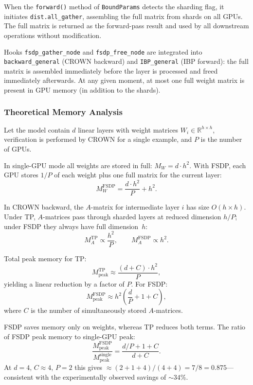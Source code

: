 When the \texttt{forward()} method of \texttt{BoundParams} detects the sharding
flag, it initiates \texttt{dist.all\_gather}, assembling the full matrix from
shards on all GPUs. The full matrix is returned as the forward-pass result and
used by all downstream operations without modification.

Hooks \texttt{fsdp\_gather\_node} and \texttt{fsdp\_free\_node} are integrated
into \texttt{backward\_general} (CROWN backward) and \texttt{IBP\_general}
(IBP forward): the full matrix is assembled immediately before the layer is
processed and freed immediately afterwards. At any given moment, at most one
full weight matrix is present in GPU memory (in addition to the shards).

\subsubsection{Theoretical Memory Analysis}
\label{sec:fsdp-memory-theory}

Let the model contain $d$ linear layers with weight matrices
$W_i \in \mathbb{R}^{h \times h}$, verification is performed by CROWN for a
single example, and $P$ is the number of GPUs.

In single-GPU mode all weights are stored in full: $M_W = d \cdot h^2$.
With FSDP, each GPU stores $1/P$ of each weight plus one full matrix for the
current layer:
$$M_W^{\text{FSDP}} = \frac{d \cdot h^2}{P} + h^2.$$

In CROWN backward, the $A$-matrix for intermediate layer $i$ has size
$O(h \times h)$. Under TP, $A$-matrices pass through sharded layers at reduced
dimension $h/P$; under FSDP they always have full dimension~$h$:
$$M_A^{\text{TP}} \propto \frac{h^2}{P}, \qquad
  M_A^{\text{FSDP}} \propto h^2.$$

Total peak memory for TP:
$$M_{\text{peak}}^{\text{TP}} \approx
    \frac{(d + C) \cdot h^2}{P},$$
yielding a linear reduction by a factor of $P$. For FSDP:
$$M_{\text{peak}}^{\text{FSDP}} \approx
    h^2 \!\left(\frac{d}{P} + 1 + C\right),$$
where $C$ is the number of simultaneously stored $A$-matrices.

FSDP saves memory only on weights, whereas TP reduces both terms. The ratio
of FSDP peak memory to single-GPU peak:
$$\frac{M_{\text{peak}}^{\text{FSDP}}}{M_{\text{peak}}^{\text{single}}}
    = \frac{d/P + 1 + C}{d + C}.$$
At $d = 4$, $C \approx 4$, $P = 2$ this gives
$\approx (2 + 1 + 4)/(4 + 4) = 7/8 = 0.875$---consistent with the
experimentally observed savings of ${\sim}34$\%.

